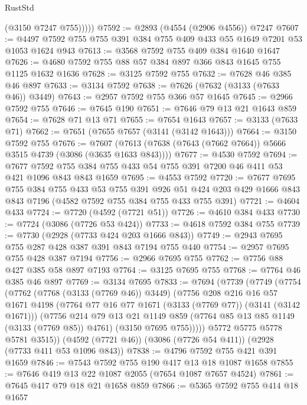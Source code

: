 \begin{lexlean}{RustStd}
\begin{coremodule}
            (@3150 @7247 @755)))))
@7592 := @2893 (@4554 (@2906 @4556)) @7247
@7607 := @4497 @7592 @755 @755 @391 @384 @755 @409 @433 @55 @1649 @7201 @53 @1053 @1624 @943
@7613 := @3568 @7592 @755 @409 @384 @1640 @1647
@7626 := @4680 @7592 @755 @88 @57 @384 @897 @366 @843 @1645 @755 @1125 @1632 @1636
@7628 := @3125 @7592 @755
@7632 := @7628 @46 @385 @46 @897
@7633 := @3134 @7592
@7638 := @7626 (@7632 (@3133 (@7633 @46)) @3449)
@7643 := @2957 @7592 @755 @366 @57 @1645
@7645 := @2966 @7592 @755
@7646 := @7645 @190
@7651 := @7646 @79 @13 @21 @1643 @859
@7654 := @7628 @71 @13 @71
@7655 := @7654 @1643
@7657 := @3133 (@7633 @71)
@7662 := @7651 (@7655 @7657 (@3141 (@3142 @1643)))
@7664 := @3150 @7592 @755
@7676 := @7607 (@7613 (@7638 (@7643 (@7662 @7664)) @5666 @3515 @4739 (@3086 (@3635 @1633 @843))))
@7677 := @4530 @7592
@7694 := @7677 @7592 @755 @384 @755 @433 @54 @755 @391 @7200 @46 @411 @53 @421 @1096 @843 @843 @1659
@7695 := @4553 @7592
@7720 := @7677
    @7695
    @755
    @384
    @755
    @433
    @53
    @755
    @391
    @926
    @51
    @424
    @203
    @429
    @1666
    @843
    @843
    @7196
    (@4582 @7592 @755 @384 @755 @433 @755 @391)
@7721 := @4604 @433
@7724 := @7720 (@4592 (@7721 @51))
@7726 := @4610 @384 @433
@7730 := @7724 (@3086 (@7726 @53 @424))
@7733 := @4618 @7592 @384 @755
@7739 := @7730 (@2928 (@7733 @424 @203 @1666 @843))
@7749 := @2943 @7695 @755 @287 @428 @387 @391 @843 @7194 @755 @440
@7754 := @2957 @7695 @755 @428 @387 @7194
@7756 := @2966 @7695 @755
@7762 := @7756 @88 @427 @385 @58 @897 @7193
@7764 := @3125 @7695 @755
@7768 := @7764 @46 @385 @46 @897
@7769 := @3134 @7695
@7833 := @7694
    (@7739
      (@7749
        (@7754
          (@7762
            (@7768 (@3133 (@7769 @46)) @3449)
            (@7756
              @208
              @216
              @16
              @57
              @1671
              @4198
              (@7764 @77 @16 @77 @1671 (@3133 (@7769 @77)) (@3141 (@3142 @1671)))
              (@7756
                @214
                @79
                @13
                @21
                @1149
                @859
                (@7764 @85 @13 @85 @1149 (@3133 (@7769 @85)) @4761)
                (@3150 @7695 @755)))))
        @5772
        @5775
        @5778
        @5781
        @3515))
    (@4592 (@7721 @46))
    (@3086 (@7726 @54 @411))
    (@2928 (@7733 @411 @53 @1096 @843))
@7838 := @4796 @7592 @755 @421 @391 @1659
@7846 := @7543 @7592 @755 @190 @417 @13 @18 @1087 @1658
@7855 := @7646 @419 @13 @22 @1087 @2055 (@7654 @1087 @7657 @4524)
@7861 := @7645 @417 @79 @18 @21 @1658 @859
@7866 := @5365 @7592 @755 @414 @18 @1657

\end{coremodule}
\end{lexlean}
